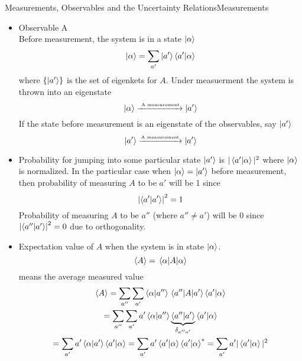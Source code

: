 \begin{frame}{Measurements, Observables and the Uncertainty Relations}{Measurements}
	\begin{itemize}
		\item Observable A \\
		      Before measurement, the system is in a state $\ket \alpha$
		      \[
			      \ket{\alpha} = \sum_{a'} \ket{a'} \ip{a'}{\alpha}
		      \]
		      where $\{\ket{a'}\}$ is the set of eigenkets for $A$. Under measuerment the system is thrown into an eigenstate
		      \[ \ket{\alpha} \xrightarrow{\text{ \tiny A measurement}} \ket{a'}\]
		      If the state before measurement is an eigenstate of the observables, say $\ket{a'}$
		      \[ \ket{a'} \xrightarrow{\text{\tiny A measurement}} \ket{a'}\]
	\end{itemize}
\end{frame}

\begin{frame}
	\begin{itemize}
		\item Probability for jumping into some particular state $\ket{a'}$ is $|\ip{a'}{\alpha}|^2$ where $\ket{\alpha}$ is normalized.
		      In the particular case when $\ket{\alpha} = \ket{a'}$ before measurement, then probability of measuring $A$ to be $a'$ will be 1 since
		      \[\qty|\ip{a'}|^2 = 1\]
		      Probability of measuring $A$ to be $a''$ (where $a'' \neq a'$) will be 0 since $\qty|\ip{a''}{a'}|^2 = 0$ due to orthogonality.
		\item Expectation value of $A$ when the system is in state $\ket \alpha$. \[\ev{A} =\ev{A}{\alpha} \]
		      means the average measured value
		      \begin{gather*}
			      \ev{A} = \sum_{a''}\sum_{a'} \ip{\alpha}{a''}\mel{a''}{A}{a'}\ip{a'}{\alpha}\\
			      = \sum_{a''}\sum_{a'} a'\ip{\alpha}{a''} \underbrace{\ip{a''}{a'}}_{\delta_{a''a'}} \ip{a'}{\alpha}\\
			      = \sum_{a'} a' \ip{\alpha}{a'}\ip{a'}{\alpha} = \sum_{a'} a' \ip{a'}{\alpha} \ip{a'}{\alpha}^* = \sum_{a'} a'|\ip{a'}{\alpha}|^2
		      \end{gather*}
	\end{itemize}
\end{frame}


